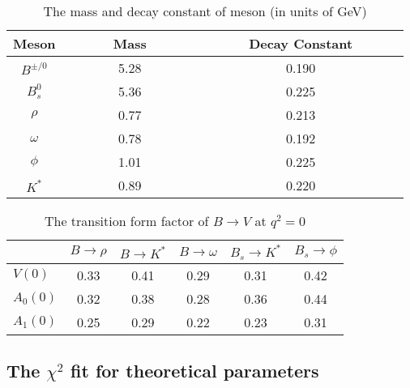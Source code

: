 \documentclass[11pt]{article}
\begin{document}
\begin{table}%
\caption{The mass and decay constant of meson (in units of GeV)}
\centering
\begin{tabular}{ccc}
\hline
\hline
Meson & ~~~~~~Mass~~~~~~ & ~~~~~~Decay Constant~~~~~~\\
\hline
$B^{\pm/0}$   &5.28 & 0.190\\
$B_s^{0}$     &5.36 & 0.225\\
$\rho$        &0.77 & 0.213\\
$\omega$      &0.78 & 0.192\\
$\phi$        &1.01 & 0.225\\
$K^*$         &0.89 & 0.220\\
\hline
\hline
\end{tabular}\label{mess and dc}
\end{table}

\begin{table}%
\caption{The transition form factor of $B\to V$ at $q^2=0$}
\centering
\begin{tabular}{lccccc}
\hline\hline
&$B \to \rho$ &$B \to K^*$ & $B\to\omega$ & $B_s\to K^*$ &$B_s\to\phi$ \\
\hline
$V(0)$  &0.33&0.41&0.29&0.31&0.42\\
$A_0(0)$&0.32&0.38&0.28&0.36&0.44\\
$A_1(0)$&0.25&0.29&0.22&0.23&0.31\\
\hline\hline
\end{tabular}\label{form factors}
\end{table}

\subsection{The $\chi^2$ fit for theoretical parameters}
\end{document}
